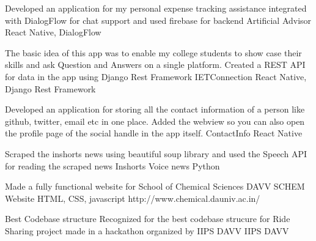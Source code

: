 \documentclass[]{awesome-cv}
\begin{document}
\vspace{-7mm}
\begin{cventries}
	\cventry
	{Developed an application for my personal expense tracking assistance integrated with DialogFlow for chat support and used firebase for backend}
	{Artificial Advisor}
	{React Native, DialogFlow}
	{}
	{}
	
	\vspace{-5mm}
	\cventry
	{The basic idea of this app was to enable my college students to show case their skills and ask Question and Answers on a single platform. Created a REST API for data in the app using Django Rest Framework}
	{IETConnection}
	{React Native, Django Rest Framework}
	{}
	{}
	
	\vspace{-5mm}
	\cventry
	{Developed an application for storing all the contact information of a person like github, twitter, email etc in one place. Added the webview so you can also open the profile page of the social handle in the app itself.}
	{ContactInfo}
	{React Native}
	{}
	{}
	
	\vspace{-5mm}
	\cventry
	{Scraped the inshorts news using beautiful soup library and used the Speech API for reading the scraped news}
	{Inshorts Voice news}
	{Python}
	{}
	{}
	
	\vspace{-5mm}
	\cventry
	{Made a fully functional website for School of Chemical Sciences DAVV}
	{SCHEM Website}
	{HTML, CSS, javascript}
	{http://www.chemical.dauniv.ac.in/}
	{}
	
	\vspace{-5mm}
\end{cventries}
\begin{cvhonors}
	\cvhonor
	{Best Codebase structure}
	{Recognized for the best codebase strucure for Ride Sharing project made in a hackathon organized by IIPS DAVV}
	{IIPS DAVV}
	{}
\end{cvhonors}
\ 
\end{document}

